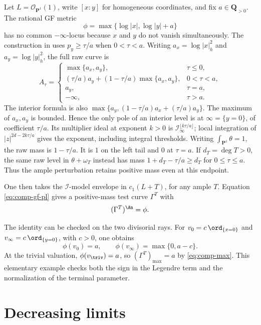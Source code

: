 \begin{example}
\label{ex:comp-two-weighted-sections}
Let $L=\mathcal O_{\mathbf P^1}(1)$, write $[x:y]$ for homogeneous
coordinates, and fix $a\in\mathbf Q_{>0}$.  The rational GF metric
\[
                 \phi=\max\{\log|x|,\log|y|+a\}
\]
has no common $-\infty$-locus because $x$ and $y$ do not vanish
simultaneously.  The construction in
 uses $p_y\geq\tau/a$ when
$0<\tau<a$. Writing $a_x=\log|x|_h^2$ and $a_y=\log|y|_h^2$,
the full raw curve is
\[
 A_\tau=
 \begin{cases}
 \max\{a_x,a_y\},&\tau\leq0,\\
 (\tau/a)a_y+(1-\tau/a)\max\{a_x,a_y\},&0<\tau<a,\\
 a_y,&\tau=a,\\
 -\infty,&\tau>a.
 \end{cases}
\tag{57.10a}\label{eq:comp-two-section-levels}
\]
The interior formula is also
$\max\{a_y,(1-\tau/a)a_x+(\tau/a)a_y\}$.
The maximum of $a_x,a_y$ is bounded. Hence the only pole of an
interior level is at $\infty=\{y=0\}$, of coefficient $\tau/a$.
Its multiplier ideal at exponent $k>0$ is
$\mathcal I_\infty^{\lfloor k\tau/a\rfloor}$; local integration of
$|z|^{2d-2k\tau/a}$ gives the exponent, including integral thresholds.
Writing $\int_{\mathbf P^1}\theta=1$, the raw mass is
$1-\tau/a$. It is $1$ on the left tail and $0$ at $\tau=a$.
If $d_T=\deg T>0$, the same raw level in $\theta+\omega_T$ instead
has mass $1+d_T-\tau/a\geq d_T$ for $0\leq\tau\leq a$.
Thus the ample perturbation retains positive mass even at this endpoint.

One then takes the $\mathcal I$-model envelope in $c_1(L+T)$,
for any ample $T$. Equation
\eqref{eq:comp-gf-pl} gives a positive-mass test curve $\Gamma^T$ with
\[
                         (\Gamma^T)^{\An}=\phi.
\]

The identity can be checked on the two divisorial rays.  For
$v_0=c\,\ord_{\{x=0\}}$ and
$v_\infty=c\,\ord_{\{y=0\}}$, with $c>0$, one obtains
\[
       \phi(v_0)=a,
       \qquad
       \phi(v_\infty)=\max\{0,a-c\}.
\]
At the trivial valuation, $\phi(v_{\triv})=a$, so
$(\Gamma^T)_{\max}=a$ by \eqref{eq:comp-max}.  This elementary example checks
both the sign in the Legendre term and the normalization of the terminal
parameter.
\end{example}

\section{Decreasing limits}
\label{sec:comp-decreasing}

